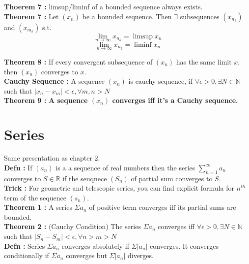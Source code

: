 \documentclass{report}
\begin{document}
\noindent \textbf{Thoerem 7 :} limsup/liminf of a bounded sequence always exists.\\

\noindent \textbf{Theorem 7 :} Let $(x_n)$ be a bounded sequence. Then $\exists$ subsequences $(x_{n_k})$ and $(x_{m_k})$ s.t.
$$\lim_{n\to\infty}x_{n_k} = \limsup x_n$$
$$\lim_{n\to\infty}x_{n_k} = \liminf x_n$$



\noindent \textbf{Theorem 8 :} If every convergent subsequence of $(x_n)$ has the same limit $x$, then $(x_n)$ converges to $x$.\\

\noindent \textbf{Cauchy Sequence :} A sequence $(x_n)$ is cauchy sequence, if $\forall \epsilon > 0, \exists N \in \mathbb{N}$ such that $|x_n - x_m| < \epsilon , \forall m,n> N$\\

\noindent \textbf{Theorem 9 :} \textbf{A sequence $(x_n)$ converges iff it's a Cauchy sequence.}\\




\chapter{Series}
Same presentation as chapter 2.\\

\noindent \textbf{Defn : }If $(a_n)$ is a a sequence of real numbers then the series $\sum_{n=1}^{\infty}a_n$  converges to $S \in \mathbb{R}$ if the seuqnece $(S_n)$ of partial sum converges to $S$.\\

\noindent \textbf{Trick : } For geometric and telescopic series, you can find explicit formula for $n^{th}$ term of the sequence $(s_n)$.\\

\noindent \textbf{Theorem 1 :} A series $\Sigma a_n$ of positive term converges iff its partial sums are bounded.\\

\noindent \textbf{Theorem 2 :} (Cauchy Condition) The series $\Sigma a_n$ converges iff $\forall \epsilon > 0, \exists N \in \mathbb{N}$ such that $|S_n - S_m| < \epsilon, \forall n > m > N$\\

\noindent \textbf{Defn :} Series $\Sigma a_n$ converges absolutely if $\Sigma |a_n|$ converges. It converges conditionally if $\Sigma a_n$ converges but $\Sigma |a_n|$ diverges.\\
\end{document}
